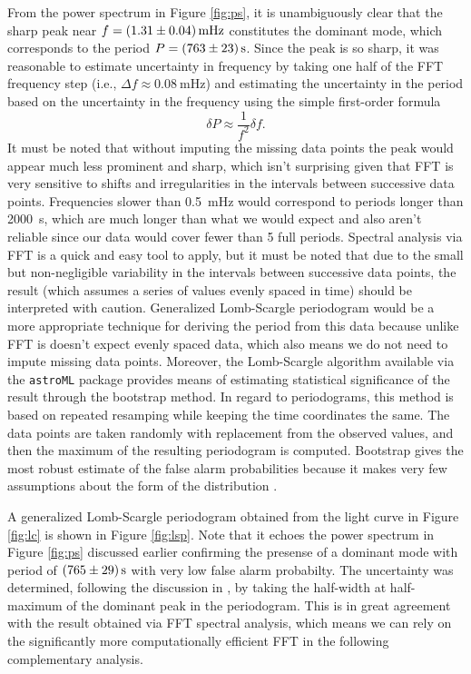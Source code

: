 \documentclass{aastex631}
\begin{document}
From the power spectrum in Figure \ref{fig:ps}, it is unambiguously
clear that the sharp peak near $f=\SI{1.31\pm0.04}{\milli\hertz}$
constitutes the dominant mode, which corresponds to the period
$P=\SI{763\pm 23}{\second}$. Since the peak is so sharp, it was
reasonable to estimate uncertainty in frequency by taking one half of
the FFT frequency step (i.e., $\Delta
f\approx\SI{0.08}{\milli\hertz}$) and estimating the uncertainty in
the period based on the uncertainty in the frequency using the simple
first-order formula
\[
  \delta P\approx \frac{1}{f^2}\delta f.
\]
It must be noted that without imputing the missing data points the
peak would appear much less prominent and sharp, which isn't
surprising given that FFT is very sensitive to shifts and
irregularities in the intervals between successive data
points. Frequencies slower than \SI{0.5}{\milli\hertz} would
correspond to periods longer than \SI{2000}{\second}, which are much
longer than what we would expect and also aren't reliable since our
data would cover fewer than 5 full periods. Spectral analysis via FFT
is a quick and easy tool to apply, but it must be noted that due to
the small but non-negligible variability in the intervals between
successive data points, the result (which assumes a series of values
evenly spaced in time) should be interpreted with caution. Generalized
Lomb-Scargle periodogram would be a more appropriate technique for
deriving the period from this data because unlike FFT is doesn't
expect evenly spaced data, which also means we do not need to impute
missing data points. Moreover, the Lomb-Scargle algorithm available
via the \texttt{astroML} package provides means of estimating
statistical significance of the result through the bootstrap
method. In regard to periodograms, this method is based on repeated
resamping while keeping the time coordinates the same. The data points
are taken randomly with replacement from the observed values, and then
the maximum of the resulting periodogram is computed. Bootstrap gives
the most robust estimate of the false alarm probabilities because it
makes very few assumptions about the form of the distribution
\citep{VanderPlas_2018}.

A generalized Lomb-Scargle periodogram obtained from the light curve
in Figure \ref{fig:lc} is shown in Figure \ref{fig:lsp}. Note that it
echoes the power spectrum in Figure \ref{fig:ps} discussed earlier
confirming the presense of a dominant mode with period of $\SI{765\pm
  29}{\second}$ with very low false alarm probabilty. The uncertainty
was determined, following the discussion in \citet{VanderPlas_2018},
by taking the half-width at half-maximum of the dominant peak in the
periodogram. This is in great agreement with the result obtained via
FFT spectral analysis, which means we can rely on the significantly
more computationally efficient FFT in the following complementary
analysis.
\end{document}
